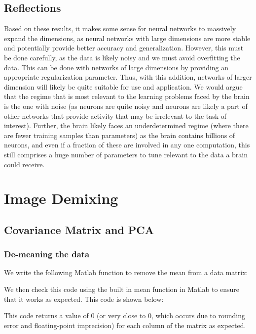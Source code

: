 \documentclass[11pt, oneside]{article}
\begin{document}
\subsection{Reflections}

Based on these results, it makes some sense for neural networks to massively expand the dimensions, as neural networks with large dimensions are more stable and potentially provide better accuracy and generalization. However, this must be done carefully, as the data is likely noisy and we must avoid overfitting the data. This can be done with networks of large dimensions by providing an appropriate regularization parameter. Thus, with this addition, networks of larger dimension will likely be quite suitable for use and application. We would argue that the regime that is most relevant to the learning problems faced by the brain is the one with noise (as neurons are quite noisy and neurons are likely a part of other networks that provide activity that may be irrelevant to the task of interest). Further, the brain likely faces an underdetermined regime (where there are fewer training samples than parameters) as the brain contains billions of neurons, and even if a fraction of these are involved in any one computation, this still comprises a huge number of parameters to tune relevant to the data a brain could receive.

\section{Image Demixing}

\subsection{Covariance Matrix and PCA}

\subsubsection{De-meaning the data}

We write the following Matlab function to remove the mean from a data matrix:

We then check this code using the built in mean function in Matlab to ensure that it works as expected. This code is shown below:

This code returns a value of 0 (or very close to 0, which occurs due to rounding error and floating-point imprecision) for each column of the matrix as expected.
\end{document}
